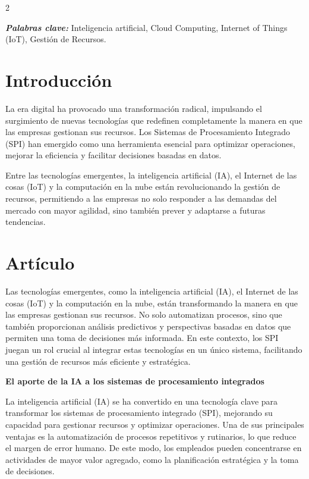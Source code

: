 \documentclass[12pt,spanish,Letterpaper,openany]{book}
\begin{document}
\begin {multicols}{2}

\textbf{\emph{Palabras clave:}} Inteligencia artificial, Cloud Computing, Internet of Things (IoT), Gestión de Recursos.

\hypertarget{introducciuxf3n-5}{%
\section{Introducción}\label{introducciuxf3n-5}}

La era digital ha provocado una transformación radical, impulsando el surgimiento de nuevas tecnologías que redefinen completamente la manera en que las empresas gestionan sus recursos. Los Sistemas de Procesamiento Integrado (SPI) han emergido como una herramienta esencial para optimizar operaciones, mejorar la eficiencia y facilitar decisiones
basadas en datos.

Entre las tecnologías emergentes, la inteligencia artificial (IA), el Internet de las cosas (IoT) y la computación en la nube están revolucionando la gestión de recursos, permitiendo a las empresas no solo responder a las demandas del mercado con mayor agilidad, sino también prever y adaptarse a futuras tendencias.

\hypertarget{artuxedculo-5}{%
\section{Artículo}\label{artuxedculo-5}}

Las tecnologías emergentes, como la inteligencia artificial (IA), el Internet de las cosas (IoT) y la computación en la nube, están transformando la manera en que las empresas gestionan sus recursos. No solo automatizan procesos, sino que también proporcionan análisis predictivos y perspectivas basadas en datos que permiten una toma de decisiones más informada. En este contexto, los SPI juegan un rol crucial al integrar estas tecnologías en un único sistema, facilitando una gestión de recursos más eficiente y estratégica.

\textbf{El aporte de la IA a los sistemas de procesamiento integrados}

La inteligencia artificial (IA) se ha convertido en una tecnología clave para transformar los sistemas de procesamiento integrado (SPI), mejorando su capacidad para gestionar recursos y optimizar operaciones. Una de sus principales ventajas es la automatización de procesos repetitivos y rutinarios, lo que reduce el margen de error humano. De este modo, los empleados pueden concentrarse en actividades de mayor valor agregado, como la planificación estratégica y la toma de decisiones.


\end{multicols}
\end{document}
